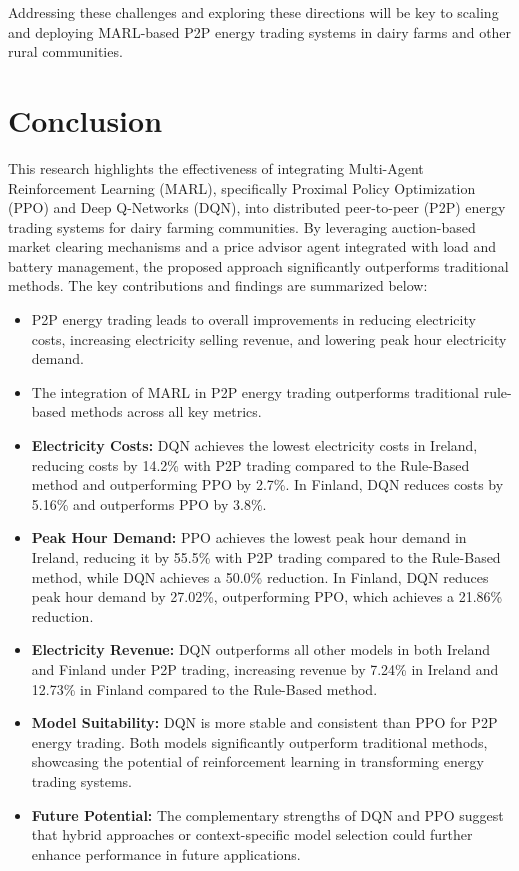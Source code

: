 \documentclass[preprint,12pt]{elsarticle}
\begin{document}
Addressing these challenges and exploring these directions will be key to scaling and deploying MARL-based P2P energy trading systems in dairy farms and other rural communities.




\section{Conclusion}

This research highlights the effectiveness of integrating Multi-Agent Reinforcement Learning (MARL), specifically Proximal Policy Optimization (PPO) and Deep Q-Networks (DQN), into distributed peer-to-peer (P2P) energy trading systems for dairy farming communities. By leveraging auction-based market clearing mechanisms and a price advisor agent integrated with load and battery management, the proposed approach significantly outperforms traditional methods. The key contributions and findings are summarized below:

\begin{itemize}
    \item P2P energy trading leads to overall improvements in reducing electricity costs, increasing electricity selling revenue, and lowering peak hour electricity demand.
    \item The integration of MARL in P2P energy trading outperforms traditional rule-based methods across all key metrics.
    \item \textbf{Electricity Costs:} DQN achieves the lowest electricity costs in Ireland, reducing costs by 14.2\% with P2P trading compared to the Rule-Based method and outperforming PPO by 2.7\%. In Finland, DQN reduces costs by 5.16\% and outperforms PPO by 3.8\%.
    \item \textbf{Peak Hour Demand:} PPO achieves the lowest peak hour demand in Ireland, reducing it by 55.5\% with P2P trading compared to the Rule-Based method, while DQN achieves a 50.0\% reduction. In Finland, DQN reduces peak hour demand by 27.02\%, outperforming PPO, which achieves a 21.86\% reduction.
    \item \textbf{Electricity Revenue:} DQN outperforms all other models in both Ireland and Finland under P2P trading, increasing revenue by 7.24\% in Ireland and 12.73\% in Finland compared to the Rule-Based method.
    \item \textbf{Model Suitability:} DQN is more stable and consistent than PPO for P2P energy trading. Both models significantly outperform traditional methods, showcasing the potential of reinforcement learning in transforming energy trading systems.
    \item \textbf{Future Potential:} The complementary strengths of DQN and PPO suggest that hybrid approaches or context-specific model selection could further enhance performance in future applications.
\end{itemize}
\end{document}
